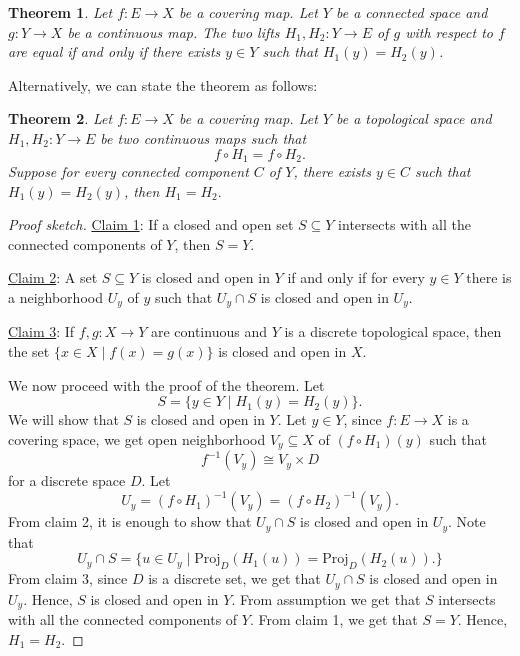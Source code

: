\documentclass[12pt]{article}
\newtheorem{theorem}{Theorem}
\begin{document}
\begin{theorem}
    Let $f:E\to X$ be a covering map. Let $Y$ be a connected space  and $g:Y\to X$ be a continuous map. The two lifts $H_1,H_2:Y\to E$ of $g$ with respect to $f$ are equal if and only if there exists $y\in Y$ such that $H_1(y) = H_2(y)$.
\end{theorem}




Alternatively, we can state the theorem as follows:


\begin{theorem}
    Let $f:E\to X$ be a covering map. Let $Y$ be a topological space and $H_1, H_2:Y\to E$ be two continuous maps such that $$f\circ H_1 = f\circ H_2.$$
    Suppose for every connected component $C$ of $Y$, there exists $y\in C$ such that $H_1(y) = H_2(y)$, then $H_1 = H_2.$
\end{theorem}


\begin{proof}[Proof sketch]
    \underline{Claim 1}: If a closed and open set $S \subseteq  Y$ intersects with all the connected components of $Y$, then $S=Y$.

    \underline{Claim 2}:  A set $S \subseteq Y$ is closed and open in $Y$ if and only if for every $y \in Y$
    there is a neighborhood $U_y$ of $y$ such that $U_y \cap S$ is closed and open in $U_y$.

    \underline{Claim 3}: If $f, g : X \to Y$ are continuous and $Y$ is a discrete topological space, then the set $\{x \in X \mid f(x) = g(x)\}$ is closed and open in $X$.
    
    We now proceed with the proof of the theorem.
    Let $$S=\{y\in Y\mid H_1(y) = H_2(y)\}.$$ We will show that $S$ is closed and open in $Y$. Let $y\in Y$, since $f:E\to X$ is a covering space, we get open neighborhood $V_y\subseteq X$ of $(f\circ H_1)(y)$ such that 
    \[
        f^{-1}(V_y) \cong V_y \times D
    \]
    for a discrete space $D$.
    Let 
    \[
        U_y = (f\circ H_1)^{-1}(V_y) = (f\circ H_2)^{-1}(V_y).
    \]  
    From claim 2, it is enough to show that $U_y\cap S$ is closed and open in $U_y$. Note that 
    \[
        U_y\cap S = \{u\in U_y\mid \text{Proj}_D(H_1(u)) = \text{Proj}_D(H_2(u)).\}
    \] 
    From claim 3, since $D$ is a discrete set, we get that $U_y\cap S$ is closed and open in $U_y$. Hence, $S$ is closed and open in $Y$. From assumption we get that $S$ intersects with all the connected components of $Y$. From claim 1, we get that $S=Y$. Hence, $H_1 = H_2$.
\end{proof}
\end{document}
